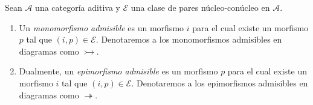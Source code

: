 \documentclass[tesis]{subfiles}
\begin{document}
\begin{Def}\label{Def: Monomorfismos escindibles y epimorfismos escindibles}

    Sean $\mathscr{A}$ una categoría aditiva y $\mathscr{E}$ una clase de pares núcleo-conúcleo en $\mathscr{A}$.

    \begin{enumerate}[label=(\alph*)]
    
        \item Un \emph{monomorfismo admisible} es un morfismo $i$ para el cual existe un morfismo $p$ tal que $(i,p)\in\mathscr{E}$. Denotaremos a los monomorfismos admisibles en diagramas como $\rightarrowtail$.

        \item Dualmente, un \emph{epimorfismo admisible} es un morfismo $p$ para el cual existe un morfismo $i$ tal que $(i,p)\in\mathscr{E}$. Denotaremos a los epimorfismos admisibles en diagramas como $\twoheadrightarrow$.
    \end{enumerate}
\end{Def}
\end{document}
